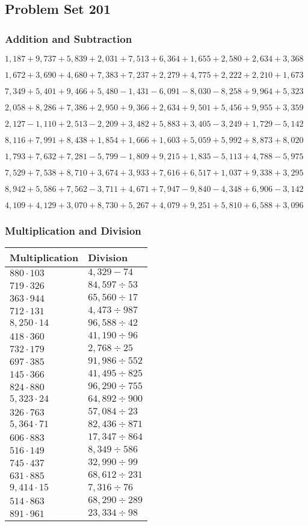 \hypertarget{problem-set-201}{%
\subsection{Problem Set 201}\label{problem-set-201}}

\hypertarget{addition-and-subtraction}{%
\subsubsection{Addition and
Subtraction}\label{addition-and-subtraction}}

\(1,187+9,737+5,839+2,031+7,513+6,364+1,655+2,580+2,634+3,368\)

\(1,672+3,690+4,680+7,383+7,237+2,279+4,775+2,222+2,210+1,673\)

\(7,349+5,401+9,466+5,480-1,431-6,091-8,030-8,258+9,964+5,323\)

\(2,058+8,286+7,386+2,950+9,366+2,634+9,501+5,456+9,955+3,359\)

\(2,127-1,110+2,513-2,209+3,482+5,883+3,405-3,249+1,729-5,142\)

\(8,116+7,991+8,438+1,854+1,666+1,603+5,059+5,992+8,873+8,020\)

\(1,793+7,632+7,281-5,799-1,809+9,215+1,835-5,113+4,788-5,975\)

\(7,529+7,538+8,710+3,674+3,933+7,616+6,517+1,037+9,338+3,295\)

\(8,942+5,586+7,562-3,711+4,671+7,947-9,840-4,348+6,906-3,142\)

\(4,109+4,129+3,070+8,730+5,267+4,079+9,251+5,810+6,588+3,096\)

\hypertarget{multiplication-and-division}{%
\subsubsection{Multiplication and
Division}\label{multiplication-and-division}}

\begin{longtable}[]{@{}ll@{}}
\toprule
Multiplication & Division\tabularnewline
\midrule
\endhead
\(880\cdot103\) & \(4,329-74\)\tabularnewline
\(719\cdot326\) & \(84,597÷53\)\tabularnewline
\(363\cdot944\) & \(65,560÷17\)\tabularnewline
\(712\cdot131\) & \(4,473÷987\)\tabularnewline
\(8,250\cdot14\) & \(96,588÷42\)\tabularnewline
\(418\cdot360\) & \(41,190÷96\)\tabularnewline
\(732\cdot179\) & \(2,768÷25\)\tabularnewline
\(697\cdot385\) & \(91,986÷552\)\tabularnewline
\(145\cdot366\) & \(41,495÷825\)\tabularnewline
\(824\cdot880\) & \(96,290÷755\)\tabularnewline
\(5,323\cdot24\) & \(64,892÷900\)\tabularnewline
\(326\cdot763\) & \(57,084÷23\)\tabularnewline
\(5,364\cdot71\) & \(82,436÷871\)\tabularnewline
\(606\cdot883\) & \(17,347÷864\)\tabularnewline
\(516\cdot149\) & \(8,349÷586\)\tabularnewline
\(745\cdot437\) & \(32,990÷99\)\tabularnewline
\(631\cdot885\) & \(68,612÷231\)\tabularnewline
\(9,414\cdot15\) & \(7,316÷76\)\tabularnewline
\(514\cdot863\) & \(68,290÷289\)\tabularnewline
\(891\cdot961\) & \(23,334÷98\)\tabularnewline
\bottomrule
\end{longtable}
